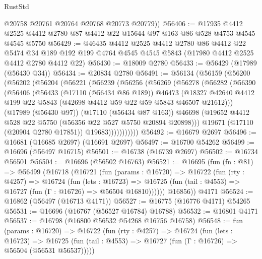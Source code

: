 \begin{lexlean}{RustStd}
\begin{coremodule}
        @20758
        @20761
        @20764
        @20768
        @20773
        @20779))
@56406 := @17935
    @4412
    @2525
    @4412
    @2780
    @87
    @4412
    @22
    @15644
    @97
    @163
    @86
    @528
    @4753
    @4545
    @4545
    @5750
@56429 := @46435
    @4412
    @2525
    @4412
    @2780
    @86
    @4412
    @22
    @5474
    @34
    @189
    @192
    @199
    @4764
    @4545
    @4545
    @5843
    (@17980 @4412 @2525 @4412 @2780 @4412 @22)
@56430 := @18009 @2780
@56433 := @56429 (@17989 (@56430 @34))
@56434 := @20834 @2780
@56491 := @56134
    (@56159
      (@56200
        (@56202
          (@56204
            (@56221
              (@56239
                (@56256
                  (@56269
                    (@56278
                      (@56282
                        (@56390
                          (@56406
                            (@56433
                              (@17110 (@56434 @86 @189))
                              @46473
                              (@18327
                                @42640
                                @4412
                                @199
                                @22
                                @5843
                                (@42698 @4412 @59 @22 @59 @5843 @46507 @21612)))
                            (@17989 (@56430 @97))
                            (@17110 (@56434 @87 @163))
                            @46698
                            (@19652 @4412 @528 @22 @5750 (@56356 @22 @527 @5750 @20894 @20898)))
                          @19671
                          (@17110 (@20904 @2780 @17851))
                          @19683)))))))))))
@56492 := @16679 @2697
@56496 := @16681 (@16685 @2697) (@16691 @2697)
@56497 := @16700 @54262
@56499 := @16696 (@56497 @16715)
@56501 := @16738 (@16739 @2697)
@56502 := @16734 @56501
@56504 := @16696 (@56502 @16763)
@56521 := @16695
    (fun (fn : @81) =>
    @56499
      (@16718
        (@16721
          (fun (params : @16720) =>
          @16722
            (fun (rty : @4257) =>
            @16724
              (fun (lets : @16723) =>
              @16725 (fun (tail : @4553) => @16727 (fun (Γ : @16726) => @56504 @16810))))))
        @16856))
    @4171
@56524 := @16862 (@56497 (@16713 @4171))
@56527 := @16775 (@16776 @4171) @54265
@56531 := @16696 (@16767 (@56527 @16784) @16788)
@56532 := @16801 @4171
@56537 := @16798 (@16800 @56532 @54268 @16756 @16758)
@56548 := fun (params : @16720) =>
  @16722
    (fun (rty : @4257) =>
    @16724
      (fun (lets : @16723) =>
      @16725 (fun (tail : @4553) => @16727 (fun (Γ : @16726) => @56504 (@56531 @56537)))))

\end{coremodule}
\end{lexlean}
